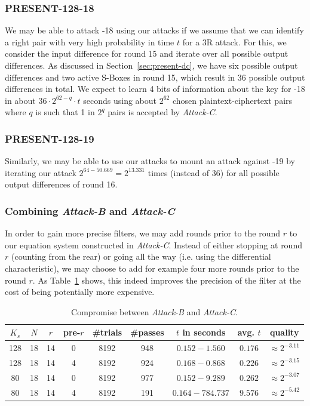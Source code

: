 \subsubsection{PRESENT-128-18}
We may be able to attack -18 using our attacks if we assume that we can identify a right pair with very high probability in time $t$ for a 3R attack. For this, we consider the input difference for round 15 and iterate over all possible output differences. As discussed in Section~\ref{sec:present-dc}, we have six possible output differences and two active S-Boxes in round 15, which result in 36 possible output differences in total. We expect to learn 4 bits of information about the key for -18 in about $36 \cdot 2^{62-q} \cdot t$ seconds using about $2^{62}$ chosen plaintext-ciphertext pairs where $q$ is such that 1 in $2^q$ pairs is accepted by \emph{Attack-C}.

\subsubsection{PRESENT-128-19}
Similarly, we  may be able to use our attacks to mount an attack against -19 by iterating our attack $2^{64-50.669} = 2^{13.331}$ times (instead of 36) for all possible output differences of round 16.


\subsubsection{Combining \emph{Attack-B} and \emph{Attack-C}}
In order to gain more precise filters, we may add rounds prior to the round $r$ to our equation system constructed in \emph{Attack-C}. Instead of either stopping at round $r$ (counting from the rear) or going all the way (i.e. using the differential characteristic), we may choose to add for example four more rounds prior to the round $r$. As Table~\ref{tab:present-bc} shows, this indeed improves the precision of the filter at the cost of being potentially more expensive.

\begin{table}[htbp]
\begin{center}
\begin{tabular}{|c|c|c|c|c|c|c|c|c|}
\hline
$K_s$ & $N$ & $r$  & pre-$r$ & \#trials & \#passes & $t$ in seconds &  avg. $t$ & quality\\
\hline
128 & 18 &  14 & 0 & 8192 & 948 & $0.152 - 1.560$ & $0.176$ & $\approx 2^{-3.11}$\\
128 & 18 &  14 & 4 & 8192 & 924 & $0.168 - 0.868$ & $0.226$ & $\approx 2^{-3.15}$\\
\hline
 80 & 18 & 14 & 0 & 8192 & 977 & $0.152 - 9.289$ & $0.262$ & $\approx 2^{-3.07}$\\
 80 & 18 & 14 & 4 & 8192 & 191 & $0.164 -  784.737$ & $9.576$ & $\approx 2^{-5.42}$\\
\hline
\end{tabular}
\end{center}
\caption{Compromise between \emph{Attack-B} and \emph{Attack-C}.}
\label{tab:present-bc}
\end{table}



